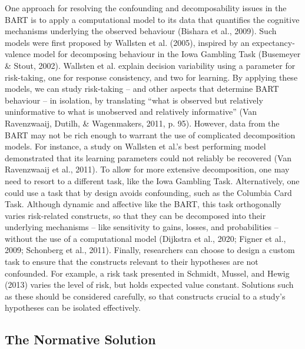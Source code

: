 \documentclass[serif, twocolumn, review]{jote-article}
\begin{document}
One approach for resolving the confounding and decomposability issues in the BART is to apply a computational model to its data that quantifies the cognitive mechanisms underlying the observed behaviour (Bishara et al., 2009). Such models were first proposed by Wallsten et al. (2005), inspired by an expectancy-valence model for decomposing behaviour in the Iowa Gambling Task (Busemeyer \& Stout, 2002). Wallsten et al. explain decision variability using a parameter for risk-taking, one for response consistency, and two for learning. By applying these models, we can study risk-taking -- and other aspects that determine BART behaviour -- in isolation, by translating ``what is observed but relatively uninformative to what is unobserved and relatively informative'' (Van Ravenzwaaij, Dutilh, \& Wagenmakers, 2011, p. 95). However, data from the BART may not be rich enough to warrant the use of complicated decomposition models. For instance, a study on Wallsten et al.'s best performing model demonstrated that its learning parameters could not reliably be recovered (Van Ravenzwaaij et al., 2011). To allow for more extensive decomposition, one may need to resort to a different task, like the Iowa Gambling Task. Alternatively, one could use a task that by design avoids confounding, such as the Columbia Card Task. Although dynamic and affective like the BART, this task orthogonally varies risk-related constructs, so that they can be decomposed into their underlying mechanisms -- like sensitivity to gains, losses, and probabilities -- without the use of a computational model (Dijkstra et al., 2020; Figner et al., 2009; Schonberg et al., 2011). Finally, researchers can choose to design a custom task to ensure that the constructs relevant to their hypotheses are not confounded. For example, a risk task presented in Schmidt, Mussel, and Hewig (2013) varies the level of risk, but holds expected value constant. Solutions such as these should be considered carefully, so that constructs crucial to a study's hypotheses can be isolated effectively.

{}
\subsection*{The Normative Solution}
\gotoreview
\label{sec:normative}
\end{document}
